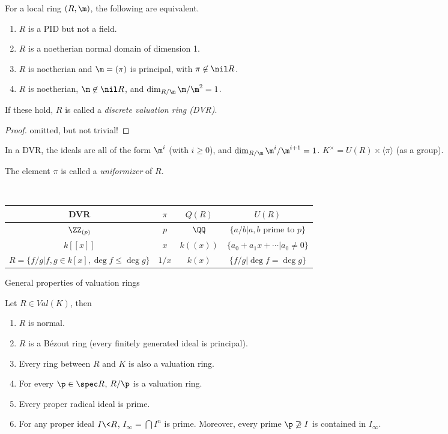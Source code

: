 \begin{theorem}
  For a local ring $(R,\m)$, the following are equivalent.
  \begin{enumerate}
    \item $R$ is a PID but not a field.
    \item $R$ is a noetherian normal domain of dimension 1.
    \item $R$ is noetherian and $\m = (\pi)$ is principal, with $\pi\not\in \nil R$.
    \item $R$ is noetherian, $\m\not\in \nil R$, and $\dim_{R/\m} \m/\m^2=1$.
  \end{enumerate}
  If these hold, $R$ is called a \emph{discrete valuation ring (DVR)}.
\end{theorem}
\begin{proof}
  omitted, but not trivial! \anton{}
\end{proof}
\begin{remark}
  In a DVR, the ideals are all of the form $\m^i$ (with $i\ge 0$), and $\dim_{R/\m}
  \m^i/\m^{i+1}=1$. $K^\times = U(R)\times \langle \pi\rangle$ (as a group).
\end{remark}
\begin{definition}
  The element $\pi$ is called a \emph{uniformizer} of $R$.
\end{definition}
\begin{example}\\
  \begin{tabular}{c|c|c|c}
    DVR & $\pi$ & $Q(R)$ & $U(R)$\\ \hline
    $\ZZ_{(p)}$ & $p$ & $\QQ$ & $\{a/b| a,b$ prime to $p\}$\\
    $k[[x]]$ & $x$ & $k((x))$ & $\{a_0+a_1x+\cdots|a_0\neq 0\}$\\
    $R=\{f/g| f,g\in k[x], \deg f\le \deg g\}$ & $1/x$ & $k(x)$ & $\{f/g|\deg f=\deg g\}$
  \end{tabular}
\end{example}
General properties of valuation rings
\begin{theorem}
  Let $R\in Val(K)$, then
  \begin{enumerate}
    \item $R$ is normal.
    \item $R$ is a B\'ezout ring (every finitely generated ideal is principal).
    \item Every ring between $R$ and $K$ is also a valuation ring.
    \item For every $\p\in \spec R$, $R/\p$ is a valuation ring.
    \item Every proper radical ideal is prime.
    \item For any proper ideal $I\< R$, $I_\infty = \bigcap I^n$ is prime. Moreover,
    every prime $\p\not\supseteq I$ is contained in $I_\infty$.
  \end{enumerate}
\end{theorem}
